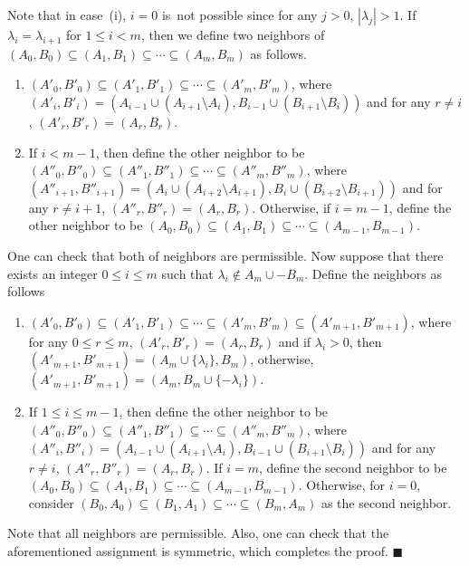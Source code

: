 \documentclass[11pt]{article}
\begin{document}
Note that in case~(i),  $i =0$ is~not possible since for any $j>0$, $|\lambda_j|>1$.
If $\lambda_i=\lambda_{i+1}$ for $1\leq i < m$, then we define two neighbors of  $(A_0, B_0)\subseteq (A_1, B_1)\subseteq \cdots \subseteq(A_m, B_m)$ as follows.
\begin{enumerate}
\item $(A'_0, B'_0)\subseteq (A'_1, B'_1)\subseteq \cdots \subseteq(A'_m, B'_m)$, where
$(A'_i, B'_i)=(A_{i-1}\cup(A_{i+1}\setminus A_i), B_{i-1}\cup(B_{i+1}\setminus B_i))$
and for any $r\not = i$, $(A'_r, B'_r)=(A_r, B_r)$.

\item If $i<m-1$, then define the other neighbor to be
$(A''_0, B''_0)\subseteq (A''_1, B''_1)\subseteq \cdots \subseteq(A''_m, B''_m)$, where $(A''_{i+1}, B''_{i+1})=(A_{i}\cup(A_{i+2}\setminus A_{i+1}), B_{i}\cup(B_{i+2}\setminus B_{i+1}))$
and for any $r\not = i+1$, $(A''_r, B''_r)=(A_r, B_r)$. Otherwise, if $i=m-1$, define the other neighbor to be
$(A_0, B_0)\subseteq (A_1, B_1)\subseteq \cdots \subseteq(A_{m-1}, B_{m-1})$.
\end{enumerate}
One can check that both of neighbors are permissible. Now suppose that
there exists an integer $0\leq i \leq m$ such that $\lambda_i\not \in A_m\cup -B_m$. Define the neighbors as follows
\begin{enumerate}
\item $(A'_0, B'_0)\subseteq (A'_1, B'_1)\subseteq \cdots \subseteq(A'_m, B'_m)\subseteq(A'_{m+1}, B'_{m+1})$, where
for any $0\leq r\leq m$, $(A'_r, B'_r)=(A_r, B_r)$ and if $\lambda_i>0$, then
$(A'_{m+1},B'_{m+1})=(A_{m}\cup\{\lambda_i\},B_{m})$, otherwise, $(A'_{m+1},B'_{m+1})=(A_{m},B_{m}\cup\{-\lambda_i\})$.

\item If $1\leq i\leq m-1$, then define the other neighbor to be
$(A''_0, B''_0)\subseteq (A''_1, B''_1)\subseteq \cdots \subseteq(A''_m, B''_m)$, where $(A''_i, B''_i)=(A_{i-1}\cup(A_{i+1}\setminus A_i), B_{i-1}\cup(B_{i+1}\setminus B_i))$
and for any $r\not = i$, $(A''_r, B''_r)=(A_r, B_r)$. If $i=m$, define the second neighbor to be
$(A_0, B_0)\subseteq (A_1, B_1)\subseteq \cdots \subseteq(A_{m-1}, B_{m-1})$. Otherwise, for $i=0$, consider
$(B_0, A_0)\subseteq (B_1, A_1)\subseteq \cdots \subseteq(B_m, A_m)$ as the second neighbor.
\end{enumerate}
Note that all neighbors are permissible.
Also, one can check that the aforementioned assignment is symmetric, which completes the proof.
\hfill$\blacksquare$\\
\end{document}
